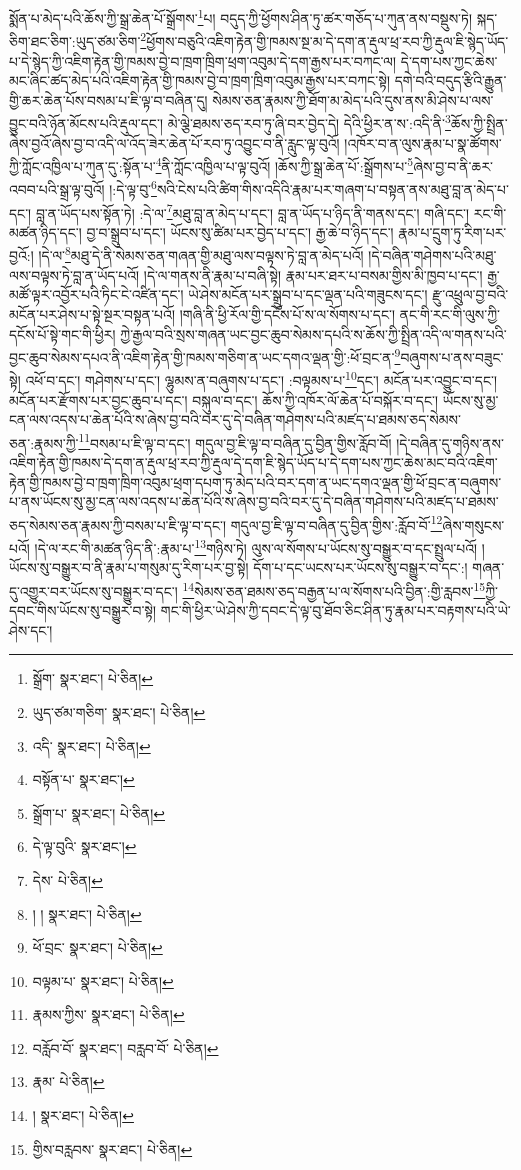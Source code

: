 སྨོན་པ་མེད་པའི་ཆོས་ཀྱི་སྒྲ་ཆེན་པོ་སྒྲོགས་\footnote{སྒྲོག་  སྣར་ཐང་།  པེ་ཅིན། }པ། བདུད་ཀྱི་ཕྱོགས་ཤིན་ཏུ་ཚར་གཅོད་པ་ཀུན་ནས་བསྡུས་ཏེ། སྐད་ཅིག་ཐང་ཅིག་:ཡུད་ཙམ་ཅིག་\footnote{ཡུད་ཙམ་གཅིག་  སྣར་ཐང་།  པེ་ཅིན། }ཕྱོགས་བཅུའི་འཇིག་རྟེན་གྱི་ཁམས་སྔ་མ་དེ་དག་ན་རྡུལ་ཕྲ་རབ་ཀྱི་རྡུལ་ཇི་སྙེད་ཡོད་པ་དེ་སྙེད་ཀྱི་འཇིག་རྟེན་གྱི་ཁམས་བྱེ་བ་ཁྲག་ཁྲིག་ཕྲག་འབུམ་དེ་དག་རྒྱས་པར་བཀང་ལ། དེ་དག་པས་ཀྱང་ཆེས་མང་ཞིང་ཚད་མེད་པའི་འཇིག་རྟེན་གྱི་ཁམས་བྱེ་བ་ཁྲག་ཁྲིག་འབུམ་རྒྱས་པར་བཀང་སྟེ། དགེ་བའི་བདུད་རྩིའི་རྒྱུན་གྱི་ཆར་ཆེན་པོས་བསམ་པ་ཇི་ལྟ་བ་བཞིན་དུ། སེམས་ཅན་རྣམས་ཀྱི་ཐོག་མ་མེད་པའི་དུས་ནས་མི་ཤེས་པ་ལས་བྱུང་བའི་ཉོན་མོངས་པའི་རྡུལ་དང་། མེ་ལྕེ་ཐམས་ཅད་རབ་ཏུ་ཞི་བར་བྱེད་དེ། དེའི་ཕྱིར་ན་ས་:འདི་ནི་\footnote{འདི་  སྣར་ཐང་།  པེ་ཅིན། }ཆོས་ཀྱི་སྤྲིན་ཞེས་བྱའོ་ཞེས་བྱ་བ་འདི་ལ་འོད་ཟེར་ཆེན་པོ་རབ་ཏུ་འབྱུང་བ་ནི་རླུང་ལྟ་བུའོ། །འཁོར་བ་ན་ལུས་རྣམ་པ་སྣ་ཚོགས་ཀྱི་ཀློང་འཁྱིལ་པ་ཀུན་དུ་:སྟོན་པ་\footnote{བསྟོན་པ་  སྣར་ཐང་། }ནི་ཀློང་འཁྱིལ་པ་ལྟ་བུའོ། །ཆོས་ཀྱི་སྒྲ་ཆེན་པོ་:སྒྲོགས་པ་\footnote{སྒྲོག་པ་  སྣར་ཐང་།  པེ་ཅིན། }ཞེས་བྱ་བ་ནི་ཆར་འབབ་པའི་སྒྲ་ལྟ་བུའོ། །:དེ་ལྟ་བུ་\footnote{དེ་ལྟ་བུའི་  སྣར་ཐང་། }སའི་ངེས་པའི་ཚིག་གིས་འདིའི་རྣམ་པར་གཞག་པ་བསྟན་ནས་མཐུ་བླ་ན་མེད་པ་དང་། བླ་ན་ཡོད་པས་སྟོན་ཏེ། :དེ་ལ་\footnote{དེས་  པེ་ཅིན། }མཐུ་བླ་ན་མེད་པ་དང་། བླ་ན་ཡོད་པ་ཉིད་ནི་གནས་དང་། གཞི་དང་། རང་གི་མཚན་ཉིད་དང་། བྱ་བ་སྒྲུབ་པ་དང་། ཡོངས་སུ་ཚིམ་པར་བྱེད་པ་དང་། རྒྱ་ཆེ་བ་ཉིད་དང་། རྣམ་པ་དྲུག་ཏུ་རིག་པར་བྱའོ:། །དེ་ལ་\footnote{། །  སྣར་ཐང་།  པེ་ཅིན། }མཐུ་དེ་ནི་སེམས་ཅན་གཞན་གྱི་མཐུ་ལས་བལྟས་ཏེ་བླ་ན་མེད་པའོ། །དེ་བཞིན་གཤེགས་པའི་མཐུ་ལས་བལྟས་ཏེ་བླ་ན་ཡོད་པའོ། །དེ་ལ་གནས་ནི་རྣམ་པ་བཞི་སྟེ། རྣམ་པར་ཐར་པ་བསམ་གྱིས་མི་ཁྱབ་པ་དང་། རྒྱ་མཚོ་ལྟར་འབྱོར་པའི་ཏིང་ངེ་འཛིན་དང་། ཡེ་ཤེས་མངོན་པར་སྒྲུབ་པ་དང་ལྡན་པའི་གཟུངས་དང་། རྫུ་འཕྲུལ་བྱ་བའི་མངོན་པར་ཤེས་པ་སྟེ་སྔར་བསྟན་པའོ། །གཞི་ནི་ཕྱི་རོལ་གྱི་དངོས་པོ་ས་ལ་སོགས་པ་དང་། ནང་གི་རང་གི་ལུས་ཀྱི་དངོས་པོ་སྟེ་གང་གི་ཕྱིར། ཀྱེ་རྒྱལ་བའི་སྲས་གཞན་ཡང་བྱང་ཆུབ་སེམས་དཔའི་ས་ཆོས་ཀྱི་སྤྲིན་འདི་ལ་གནས་པའི་བྱང་ཆུབ་སེམས་དཔའ་ནི་འཇིག་རྟེན་གྱི་ཁམས་གཅིག་ན་ཡང་དགའ་ལྡན་གྱི་:ཕོ་བྲང་ན་\footnote{ཕོ་བྲང་  སྣར་ཐང་།  པེ་ཅིན། }བཞུགས་པ་ནས་བཟུང་སྟེ། འཕོ་བ་དང་། གཤེགས་པ་དང་། ལྷུམས་ན་བཞུགས་པ་དང་། :བལྟམས་པ་\footnote{བལྟམ་པ་  སྣར་ཐང་།  པེ་ཅིན། }དང་། མངོན་པར་འབྱུང་བ་དང་། མངོན་པར་རྫོགས་པར་བྱང་ཆུབ་པ་དང་། བསྐུལ་བ་དང་། ཆོས་ཀྱི་འཁོར་ལོ་ཆེན་པོ་བསྐོར་བ་དང་། ཡོངས་སུ་མྱ་ངན་ལས་འདས་པ་ཆེན་པོའི་ས་ཞེས་བྱ་བའི་བར་དུ་དེ་བཞིན་གཤེགས་པའི་མཛད་པ་ཐམས་ཅད་སེམས་ཅན་:རྣམས་ཀྱི་\footnote{རྣམས་ཀྱིས་  སྣར་ཐང་།  པེ་ཅིན། }བསམ་པ་ཇི་ལྟ་བ་དང་། གདུལ་བྱ་ཇི་ལྟ་བ་བཞིན་དུ་བྱིན་གྱིས་རློབ་བོ། །དེ་བཞིན་དུ་གཉིས་ནས་འཇིག་རྟེན་གྱི་ཁམས་དེ་དག་ན་རྡུལ་ཕྲ་རབ་ཀྱི་རྡུལ་དེ་དག་ཇི་སྙེད་ཡོད་པ་དེ་དག་པས་ཀྱང་ཆེས་མང་བའི་འཇིག་རྟེན་གྱི་ཁམས་བྱེ་བ་ཁྲག་ཁྲིག་འབུམ་ཕྲག་དཔག་ཏུ་མེད་པའི་བར་དག་ན་ཡང་དགའ་ལྡན་གྱི་ཕོ་བྲང་ན་བཞུགས་པ་ནས་ཡོངས་སུ་མྱ་ངན་ལས་འདས་པ་ཆེན་པོའི་ས་ཞེས་བྱ་བའི་བར་དུ་དེ་བཞིན་གཤེགས་པའི་མཛད་པ་ཐམས་ཅད་སེམས་ཅན་རྣམས་ཀྱི་བསམ་པ་ཇི་ལྟ་བ་དང་། གདུལ་བྱ་ཇི་ལྟ་བ་བཞིན་དུ་བྱིན་གྱིས་:རློབ་བོ་\footnote{བརློབ་བོ་  སྣར་ཐང་། བརླབ་བོ་  པེ་ཅིན། }ཞེས་གསུངས་པའོ། །དེ་ལ་རང་གི་མཚན་ཉིད་ནི་:རྣམ་པ་\footnote{རྣམ་  པེ་ཅིན། }གཉིས་ཏེ། ལུས་ལ་སོགས་པ་ཡོངས་སུ་བསྒྱུར་བ་དང་སྤྲུལ་པའོ། །ཡོངས་སུ་བསྒྱུར་བ་ནི་རྣམ་པ་གསུམ་དུ་རིག་པར་བྱ་སྟེ། དོག་པ་དང་ཡངས་པར་ཡོངས་སུ་བསྒྱུར་བ་དང་:། གཞན་དུ་འགྱུར་བར་ཡོངས་སུ་བསྒྱུར་བ་དང་། \footnote{།    སྣར་ཐང་།  པེ་ཅིན། }སེམས་ཅན་ཐམས་ཅད་བརྒྱན་པ་ལ་སོགས་པའི་བྱིན་:གྱི་རླབས་\footnote{གྱིས་བརླབས་  སྣར་ཐང་།  པེ་ཅིན། }ཀྱི་དབང་གིས་ཡོངས་སུ་བསྒྱུར་བ་སྟེ། གང་གི་ཕྱིར་ཡེ་ཤེས་ཀྱི་དབང་དེ་ལྟ་བུ་ཐོབ་ཅིང་ཤིན་ཏུ་རྣམ་པར་བརྟགས་པའི་ཡེ་ཤེས་དང་། 
